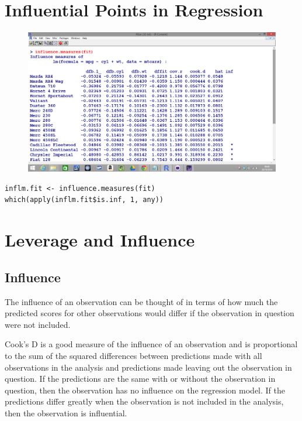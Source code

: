 \documentclass[residuals.tex]{subfiles}
\begin{document}
\newpage
	
\section{Influential Points in Regression}
 



\begin{figure}
\centering
\includegraphics[width=1.1\linewidth]{Screenshot2}
\caption{}
\label{fig:Screenshot2}
\end{figure}


\begin{verbatim}
inflm.fit <- influence.measures(fit)
which(apply(inflm.fit$is.inf, 1, any))
\end{verbatim}
\newpage
\section{Leverage and Influence}
\subsection{Influence}
The influence of an observation can be thought of in terms of how much the predicted scores for other observations would differ if the observation in question were not included. 

Cook's D is a good measure of the influence of an observation and is proportional to the sum of the squared differences between predictions made with all observations in the analysis and predictions made leaving out the observation in question. If the predictions are the same with or without the observation in question, then the observation has no influence on the regression model. If the predictions differ greatly when the observation is not included in the analysis, then the observation is influential.
\end{document}
